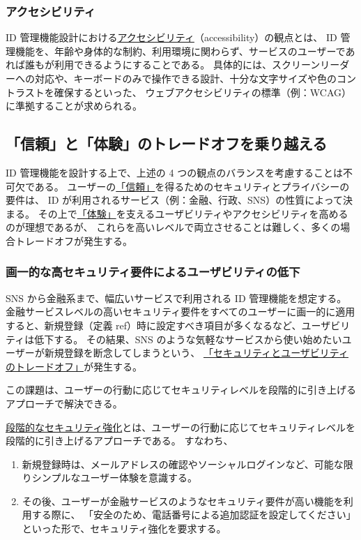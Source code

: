 \documentclass[uplatex]{jsarticle}
\def\ref#1{ref}%
\def\label#1{}%
\begin{document}
\subsubsection{アクセシビリティ}

\begin{dfn}[アクセシビリティの観点]\label{dfn:ch5-accessibility}
ID 管理機能設計における\underline{アクセシビリティ}（accessibility）の観点とは、
ID 管理機能を、年齢や身体的な制約、利用環境に関わらず、サービスのユーザーであれば誰もが利用できるようにすることである。
具体的には、スクリーンリーダーへの対応や、キーボードのみで操作できる設計、十分な文字サイズや色のコントラストを確保するといった、
ウェブアクセシビリティの標準（例：WCAG）に準拠することが求められる。
\end{dfn}

\subsection{「信頼」と「体験」のトレードオフを乗り越える}

ID 管理機能を設計する上で、上述の 4 つの観点のバランスを考慮することは不可欠である。
ユーザーの\underline{「信頼」}を得るためのセキュリティとプライバシーの要件は、
ID が利用されるサービス（例：金融、行政、SNS）の性質によって決まる。
その上で\underline{「体験」}を支えるユーザビリティやアクセシビリティを高めるのが理想であるが、
これらを高いレベルで両立させることは難しく、多くの場合トレードオフが発生する。

\subsubsection{画一的な高セキュリティ要件によるユーザビリティの低下}

\begin{exa}\label{exa:ch5-sns-to-finance}
SNS から金融系まで、幅広いサービスで利用される ID 管理機能を想定する。
金融サービスレベルの高いセキュリティ要件をすべてのユーザーに画一的に適用すると、新規登録（定義 \ref{dfn:signup}）時に設定すべき項目が多くなるなど、ユーザビリティは低下する。
その結果、SNS のような気軽なサービスから使い始めたいユーザーが新規登録を断念してしまうという、
\underline{「セキュリティとユーザビリティのトレードオフ」}が発生する。
\end{exa}

この課題は、ユーザーの行動に応じてセキュリティレベルを段階的に引き上げるアプローチで解決できる。

\begin{dfn}[段階的なセキュリティ強化]\label{dfn:ch5-step-up-security}
\underline{段階的なセキュリティ強化}とは、ユーザーの行動に応じてセキュリティレベルを段階的に引き上げるアプローチである。
すなわち、
\begin{enumerate}
\item 新規登録時は、メールアドレスの確認やソーシャルログインなど、可能な限りシンプルなユーザー体験を意識する。
\item その後、ユーザーが金融サービスのようなセキュリティ要件が高い機能を利用する際に、
「安全のため、電話番号による追加認証を設定してください」といった形で、セキュリティ強化を要求する。
\end{enumerate}
\end{dfn}
\end{document}

